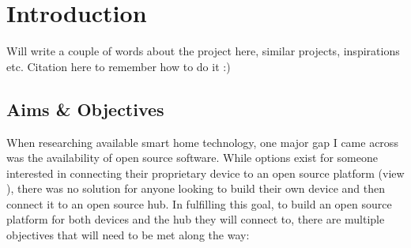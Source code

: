 \chapter{Introduction} \label{cha:intro}
Will write a couple of words about the project 
here, similar projects, inspirations etc. Citation here to remember how to do it 
:)

\section{Aims \& Objectives} \label{sec:intro:aims}
When researching available smart home technology, one major gap I came across 
was the availability of open source software. While options exist for someone 
interested in connecting their proprietary device to an open source platform 
(view ), there was no solution for anyone looking to 
build their own device and then connect it to an open source hub. In fulfilling 
this goal, to build an open source platform for both devices and the hub they 
will connect to, there are multiple objectives that will need to be met along 
the way:
